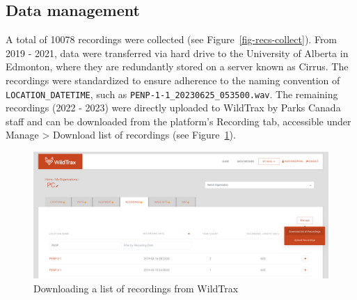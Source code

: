 \documentclass[
  letterpaper,
  DIV=11,
  numbers=noendperiod,
  oneside]{scrartcl}
\begin{document}
\hypertarget{data-management}{%
\subsection{Data management}\label{data-management}}

A total of 10078 recordings were collected (see
Figure~\ref{fig-recs-collect}). From 2019 - 2021, data were transferred
via hard drive to the University of Alberta in Edmonton, where they are
redundantly stored on a server known as Cirrus. The recordings were
standardized to ensure adherence to the naming convention of
\texttt{LOCATION\_DATETIME}, such as
\texttt{PENP-1-1\_20230625\_053500.wav}. The remaining recordings (2022
- 2023) were directly uploaded to WildTrax by Parks Canada staff and can
be downloaded from the platform's Recording tab, accessible under Manage
\textgreater{} Download list of recordings (see
Figure~\ref{fig-download-recs}).

\begin{figure}

{\centering \includegraphics{download-recs.png}

}

\caption{\label{fig-download-recs}Downloading a list of recordings from
WildTrax}

\end{figure}
\end{document}
